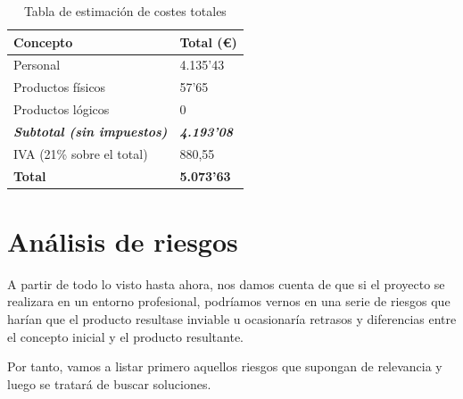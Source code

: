 \begin{center}
	\begin{table}[H]
		\centering
		\begin{tabularx}{10cm}{|X|X|}
			\hline
			{\cellcolor{lightblue}}\textbf{Concepto} & {\cellcolor{lightblue}}\textbf{Total (€)}  \\
			\hline
			Personal & 4.135'43 \\
			\hline
			Productos físicos & 57'65 \\
			\hline
			Productos lógicos & 0\\
			\hline
			\textbf{\textit{Subtotal (sin impuestos)}} & \textbf{\textit{4.193'08}}\\
			\hline
			IVA (21\% sobre el total) & 880,55\\
			\hline
			\textbf{Total} & \textbf{5.073'63} \\
			\hline
		\end{tabularx}
		\caption{Tabla de estimación de costes totales}
	\end{table}
\end{center}

\section{Análisis de riesgos}

A partir de todo lo visto hasta ahora, nos damos cuenta de que si el proyecto se realizara en un entorno profesional, podríamos vernos en una serie de riesgos que harían que el producto resultase inviable u ocasionaría retrasos y diferencias entre el concepto inicial y el producto resultante.

Por tanto, vamos a listar primero aquellos riesgos que supongan de relevancia y luego se tratará de buscar soluciones.

